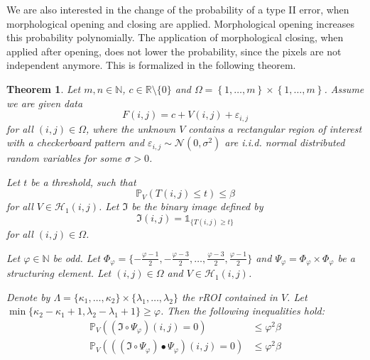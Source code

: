 \documentclass[a4paper,12pt]{article}
\theoremstyle{plain}
\newtheorem{theorem}{Theorem}[section]
\theoremstyle{definition}
\begin{document}
We are also interested in the change of the probability of a type II error, when morphological opening and closing are applied. Morphological opening increases this probability polynomially. The application of morphological closing, when applied after opening, does not lower the probability, since the pixels are not independent anymore. This is formalized in the following theorem.

\begin{theorem}
	Let $m, n \in \mathbb{N}$, $c \in \mathbb{R} \setminus \{ 0 \}$ and $\Omega = \left\{ 1, \dots, m \right\} \times \left\{ 1, \dots, m \right\}$. Assume we are given data
	\begin{equation*}
		F(i, j) = c + V(i, j) + \varepsilon_{i, j}
	\end{equation*}
	for all $(i, j) \in \Omega$, where the unknown $V$ contains a rectangular region of interest with a checkerboard pattern and $\varepsilon_{i, j} \sim \mathcal{N}(0, \sigma^2)$ are i.i.d. normal distributed random variables for some $\sigma > 0$.
	
	Let $t$ be a threshold, such that
	\begin{equation*}
		\mathbb{P}_V\left( T(i, j) \leq t \right) \leq \beta
	\end{equation*}
	for all $V \in \mathcal{H}_1(i, j)$. Let $\mathfrak{I}$ be the binary image defined by
	\begin{equation}
		\mathfrak{I}(i, j) = \mathds{1}_{ \{ T(i, j) \geq t \} }
	\end{equation}
	for all $(i, j) \in \Omega$.
	
	Let $\varphi \in \mathbb{N}$ be odd. Let $\Phi_\varphi = \{ -\frac{\varphi - 1}{2}, -\frac{\varphi - 3}{2}, \dots, \frac{\varphi - 3}{2}, \frac{\varphi - 1}{2} \}$ and $\Psi_\varphi = \Phi_\varphi \times \Phi_\varphi$ be a structuring element. Let $(i, j) \in \Omega$ and $V \in \mathcal{H}_1(i, j)$.
	
	Denote by $\varLambda = \{ \kappa_1, \dots, \kappa_2 \} \times \{ \lambda_1, \dots, \lambda_2 \}$ the rROI contained in $V$. Let $\min \{ \kappa_2 - \kappa_1 + 1, \lambda_2 - \lambda_1 + 1 \} \geq \varphi$.
	Then the following inequalities hold:
	\begin{align}
		\mathbb{P}_V( (\mathfrak{I} \circ \Psi_\varphi)(i, j) = 0 ) &\leq \varphi^2 \beta \\
		\mathbb{P}_V( ((\mathfrak{I} \circ \Psi_\varphi) \bullet \Psi_\varphi)(i, j) = 0 ) &\leq \varphi^2 \beta
	\end{align}
\end{theorem}
\end{document}
